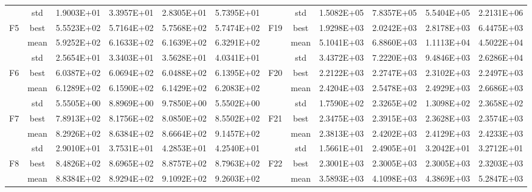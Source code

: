 \documentclass{wzuthesis}
\begin{document}
\begin{table}[htbp]
\begin{tabular}{rrrrrrccrrrr}
          & \multicolumn{1}{c}{std} & 1.9003E+01 & 3.3957E+01 & 2.8305E+01 & 5.7395E+01 &       & std   & 1.5082E+05 & 7.8357E+05 & 5.5404E+05 & 2.2131E+06 \\
    \multicolumn{1}{c}{\multirow{3}[0]{*}{F5}} & \multicolumn{1}{c}{best} & 5.5523E+02 & 5.7164E+02 & 5.7568E+02 & 5.7474E+02 & \multirow{3}[0]{*}{F19} & best  & 1.9298E+03 & 2.0242E+03 & 2.8178E+03 & 6.4475E+03 \\
          & \multicolumn{1}{c}{mean} & 5.9252E+02 & 6.1633E+02 & 6.1639E+02 & 6.3291E+02 &       & mean  & 5.1041E+03 & 6.8860E+03 & 1.1113E+04 & 4.5022E+04 \\
          & \multicolumn{1}{c}{std} & 2.5654E+01 & 3.3403E+01 & 3.5628E+01 & 4.0341E+01 &       & std   & 3.4372E+03 & 7.2220E+03 & 9.4846E+03 & 2.6286E+04 \\
    \multicolumn{1}{c}{\multirow{3}[0]{*}{F6}} & \multicolumn{1}{c}{best} & 6.0387E+02 & 6.0694E+02 & 6.0488E+02 & 6.1395E+02 & \multirow{3}[0]{*}{F20} & best  & 2.2122E+03 & 2.2747E+03 & 2.3102E+03 & 2.2497E+03 \\
          & \multicolumn{1}{c}{mean} & 6.1289E+02 & 6.1590E+02 & 6.1429E+02 & 6.2083E+02 &       & mean  & 2.4204E+03 & 2.5478E+03 & 2.4929E+03 & 2.6686E+03 \\
          & \multicolumn{1}{c}{std} & 5.5505E+00 & 8.8969E+00 & 9.7850E+00 & 5.5502E+00 &       & std   & 1.7590E+02 & 2.3265E+02 & 1.3098E+02 & 2.3658E+02 \\
    \multicolumn{1}{c}{\multirow{3}[0]{*}{F7}} & \multicolumn{1}{c}{best} & 7.8913E+02 & 8.1756E+02 & 8.0850E+02 & 8.5502E+02 & \multirow{3}[0]{*}{F21} & best  & 2.3475E+03 & 2.3915E+03 & 2.3628E+03 & 2.3574E+03 \\
          & \multicolumn{1}{c}{mean} & 8.2926E+02 & 8.6384E+02 & 8.6664E+02 & 9.1457E+02 &       & mean  & 2.3813E+03 & 2.4202E+03 & 2.4129E+03 & 2.4233E+03 \\
          & \multicolumn{1}{c}{std} & 2.9010E+01 & 3.7531E+01 & 4.2853E+01 & 4.2540E+01 &       & std   & 1.5661E+01 & 2.4905E+01 & 3.2042E+01 & 3.2712E+01 \\
    \multicolumn{1}{c}{\multirow{3}[0]{*}{F8}} & \multicolumn{1}{c}{best} & 8.4826E+02 & 8.6965E+02 & 8.8757E+02 & 8.7963E+02 & \multirow{3}[0]{*}{F22} & best  & 2.3001E+03 & 2.3005E+03 & 2.3005E+03 & 2.3203E+03 \\
          & \multicolumn{1}{c}{mean} & 8.8384E+02 & 8.9294E+02 & 9.1092E+02 & 9.2603E+02 &       & mean  & 3.5893E+03 & 4.1098E+03 & 4.3869E+03 & 5.2847E+03 \\

\end{tabular}
\end{table}
\end{document}
